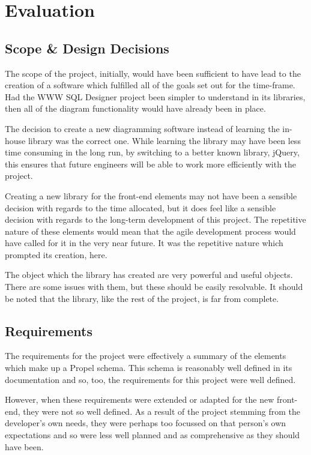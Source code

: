\cleardoublepage
\chapter{Evaluation}%
\section{Scope \& Design Decisions}
The scope of the project, initially, would have been sufficient to have lead to the creation of a software which fulfilled all of the goals set out for the time-frame. Had the WWW SQL Designer project been simpler to understand in its libraries, then all of the diagram functionality would have already been in place.

The decision to create a new diagramming software instead of learning the in-house library was the correct one. While learning the library may have been less time consuming in the long run, by switching to a better known library, jQuery, this ensures that future engineers will be able to work more efficiently with the project.

Creating a new library for the front-end elements may not have been a sensible decision with regards to the time allocated, but it does feel like a sensible decision with regards to the long-term development of this project. The repetitive nature of these elements would mean that the agile development process would have called for it in the very near future. It was the repetitive nature which prompted its creation, here.

The object which the library has created are very powerful and useful objects. There are some issues with them, but these should be easily resolvable. It should be noted that the library, like the rest of the project, is far from complete.

\section{Requirements}
The requirements for the project were effectively a summary of the elements which make up a Propel schema. This schema is reasonably well defined in its documentation and so, too, the requirements for this project were well defined.

However, when these requirements were extended or adapted for the new front-end, they were not so well defined. As a result of the project stemming from the developer's own needs, they were perhaps too focussed on that person's own expectations and so were less well planned and as comprehensive as they should have been.

